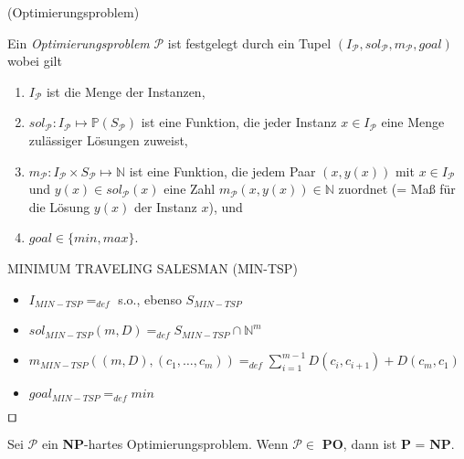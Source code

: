 \begin{definition}(Optimierungsproblem)

Ein \emph{Optimierungsproblem} $\mathcal{P}$ ist festgelegt durch ein Tupel
$(I_\mathcal{P}, sol_\mathcal{P}, m_\mathcal{P}, goal)$ wobei gilt

\begin{enumerate}
\item $I_\mathcal{P}$ ist die Menge der Instanzen,
\item $sol_\mathcal{P} : I_\mathcal{P} \longmapsto \mathbb{P}(S_\mathcal{P})$ ist eine Funktion, die jeder Instanz $x \in I_\mathcal{P}$ eine Menge zulässiger Lösungen zuweist,
\item $m_\mathcal{P} : I_\mathcal{P} \times S_\mathcal{P} \longmapsto \mathbb{N}$ ist eine Funktion, die jedem Paar $(x,y(x))$ mit $x \in I_\mathcal{P}$ und $y(x) \in sol_\mathcal{P}(x)$ eine
Zahl $m_\mathcal{P}(x,y(x)) \in \mathbb{N}$ zuordnet (= Maß für die Lösung $y(x)$ der Instanz $x$), und
\item $goal \in \{min,max\}$.
\end{enumerate}

\end{definition}

\begin{example} MINIMUM TRAVELING SALESMAN (MIN-TSP)
\begin{itemize}
\item $I_{MIN-TSP} =_{def}$ s.o., ebenso $S_{MIN-TSP}$
\item $sol_{MIN-TSP}(m,D) =_{def} S_{MIN-TSP} \cap \mathbb{N}^m$ 
\item $m_{MIN-TSP}((m,D),(c_1, \ldots , c_m)) =_{def} \sum_{i=1}^{m-1} D(c_i, c_{i+1}) + D(c_m,c_1)$ 
\item $goal_{MIN-TSP} =_{def} min$
\end{itemize}
\begin{flushright}
$\qed$
\end{flushright}
\end{example}

\begin{theorem} Sei $\mathcal{P}$ ein \textbf{NP}-hartes Optimierungsproblem.
Wenn $\mathcal{P} \in$ \textbf{PO}, dann ist \textbf{P} = \textbf{NP}.
\end{theorem}

